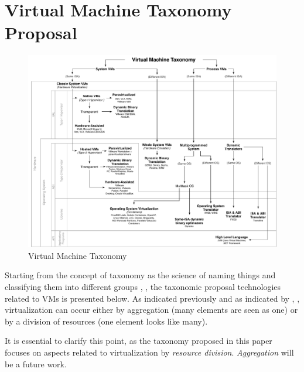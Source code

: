 	\section {Virtual Machine Taxonomy Proposal} \label{sec:taxonomiaPropuesta}
	
	\begin{figure}[!ht]%
		\centering
		\includegraphics[width=17cm]{images/virtualMachineTaxonomy.pdf}
		\vspace{-0.2cm}
		\caption{Virtual Machine Taxonomy\footnotemark[10]{}}
		\label{fig:TaxonomiaPropuesta}
	\end{figure}
	
	
	Starting from the concept of taxonomy as the science of naming things and classifying them into different groups \cite{CambridgeDictionary2018}, \cite{Chi2000}, the taxonomic proposal technologies related to VMs is presented below. As indicated previously and as indicated by \cite{Chiueh2005}, \cite{Hoopes2009}, virtualization can occur either by aggregation (many elements are seen as one) or by a division of resources (one element looks like many). 
	
	It is essential to clarify this point, as the taxonomy proposed in this paper focuses on aspects related to virtualization by \textit{resource division}. \textit{Aggregation} will be a future work.
	
